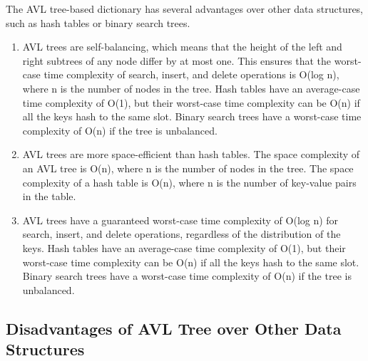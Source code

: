 \documentclass[11pt]{article}
\begin{document}
The AVL tree-based dictionary has several advantages over other data structures, such as hash tables or binary search trees.

\begin{enumerate}
    \item AVL trees are self-balancing, which means that the height of the left and right subtrees of any node differ by at most one. This ensures that the worst-case time complexity of search, insert, and delete operations is O(log n), where n is the number of nodes in the tree. Hash tables have an average-case time complexity of O(1), but their worst-case time complexity can be O(n) if all the keys hash to the same slot. Binary search trees have a worst-case time complexity of O(n) if the tree is unbalanced.

    \item AVL trees are more space-efficient than hash tables. The space complexity of an AVL tree is O(n), where n is the number of nodes in the tree. The space complexity of a hash table is O(n), where n is the number of key-value pairs in the table.

    \item AVL trees have a guaranteed worst-case time complexity of O(log n) for search, insert, and delete operations, regardless of the distribution of the keys. Hash tables have an average-case time complexity of O(1), but their worst-case time complexity can be O(n) if all the keys hash to the same slot. Binary search trees have a worst-case time complexity of O(n) if the tree is unbalanced.
\end{enumerate}

\subsection{Disadvantages of AVL Tree over Other Data Structures}
\end{document}
